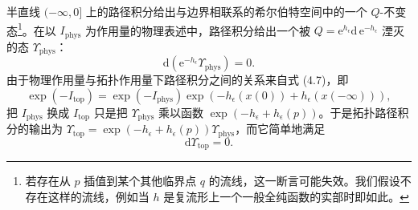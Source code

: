 \documentclass[11pt,a4paper,UTF8]{ctexart}
\theoremstyle{plain}
\theoremstyle{definition}
\begin{document}


半直线 $(-\infty,0]$ 上的路径积分给出与边界相联系的希尔伯特空间中的一个 $Q$-不变态\footnote{若存在从 $p$ 插值到某个其他临界点 $q$ 的流线，这一断言可能失效。我们假设不存在这样的流线，例如当 $h$ 是复流形上一个一般全纯函数的实部时即如此。}。在以 $I_{\mathrm{phys}}$ 为作用量的物理表述中，路径积分给出一个被 $Q=\mathrm{e}^{h_\epsilon}\mathrm{d}\,\mathrm{e}^{-h_\epsilon}$ 湮灭的态 $\Upsilon_{\mathrm{phys}}$：
\begin{equation}
    \mathrm{d}\left(\mathrm{e}^{-h_\epsilon}\Upsilon_{\mathrm{phys}}\right)=0.
    \tag{4.9}
\end{equation}
由于物理作用量与拓扑作用量下路径积分之间的关系来自式 (4.7)，即
\begin{equation}
    \exp\left(-I_{\mathrm{top}}\right)
    =\exp\left(-I_{\mathrm{phys}}\right)
    \exp\left(-h_\epsilon(x(0))+h_\epsilon(x(-\infty))\right),
    \tag{4.10}
\end{equation}
把 $I_{\mathrm{phys}}$ 换成 $I_{\mathrm{top}}$ 只是把 $\Upsilon_{\mathrm{phys}}$ 乘以函数 $\exp(-h_\epsilon+h_\epsilon(p))$。于是拓扑路径积分的输出为 $\Upsilon_{\mathrm{top}}=\exp(-h_\epsilon+h_\epsilon(p))\Upsilon_{\mathrm{phys}}$，而它简单地满足
\begin{equation}
    \mathrm{d}\Upsilon_{\mathrm{top}}=0.
    \tag{4.11}
\end{equation}

\end{document}
